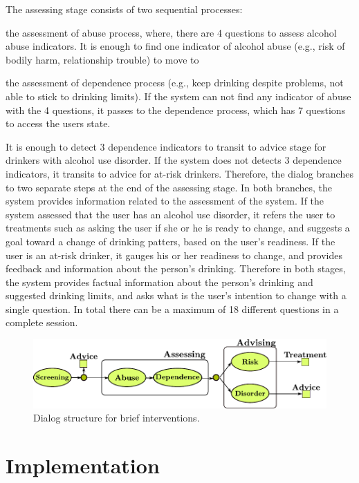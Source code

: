 \documentclass[letterpaper]{article}
\begin{document}
The assessing stage consists of two sequential processes: \begin{inparaenum}[1)] \item the 
assessment of abuse process, where, there are 4 questions to assess alcohol abuse indicators.  It is 
enough to find one indicator of alcohol abuse (e.g., risk of bodily harm, relationship trouble) to 
move to \item the assessment of dependence process (e.g., keep drinking despite problems, not able 
to stick to drinking limits). If the system can not find any indicator of abuse with the 4 
questions, it passes to the dependence process, which has  7 questions to access the users state. 
\end{inparaenum}

It is enough to detect 3 dependence indicators to transit to advice stage 
for drinkers with alcohol use disorder.  If the system does not detects 3 dependence 
indicators, it transits to advice for at-risk drinkers. Therefore, the dialog branches to two 
separate steps at the end of the assessing stage. In both branches, the system provides information 
related to the assessment of the system.  If the system assessed that the user has an alcohol use 
disorder, it refers the user to treatments such as asking  the user if she or he is ready to 
change, and suggests a goal toward a change of drinking patters, based on the user's readiness. If 
the user is an at-risk drinker, it gauges his or her readiness to change, and provides feedback and 
information about the person's drinking. Therefore in both stages, the system provides factual 
information about the person's drinking and suggested drinking limits, and asks what is the user's 
intention to change with a single question.  In total there can be a maximum of 18 different 
questions in a complete session.   

\begin{figure}[!t] 
\centering 
\includegraphics[width=.45\textwidth]{figures/dialog_manager} 
\caption{Dialog structure for brief interventions.} 
\label{fig:dialog_manager} 
\end{figure}



\section*{Implementation} 
\end{document}
